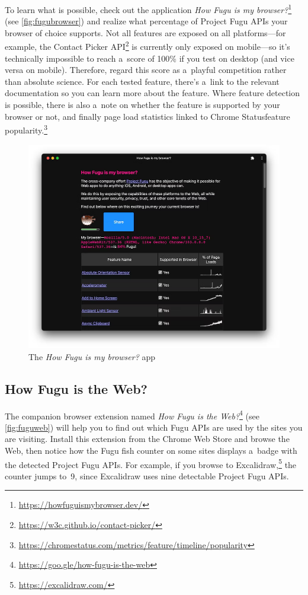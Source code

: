 \documentclass[sigconf]{acmart}
\begin{document}
To learn what is possible, check out the application \textit{How Fugu is my browser?}\footnote{\url{https://howfuguismybrowser.dev/}} (see \autoref{fig:fugubrowser}) and realize what percentage of Project Fugu APIs your browser of choice supports. Not all features are exposed on all platforms—for example, the Contact Picker API\footnote{\url{https://w3c.github.io/contact-picker/}} is currently only exposed on mobile—so it's technically impossible to reach a~score of 100\% if you test on desktop (and vice versa on mobile). Therefore, regard this score as a~playful competition rather than absolute science. For each tested feature, there's a~link to the relevant documentation so you can learn more about the feature. Where feature detection is possible, there is also a~note on whether the feature is supported by your browser or not, and finally page load statistics linked to Chrome Statusfeature popularity.\footnote{\url{https://chromestatus.com/metrics/feature/timeline/popularity}}

\begin{figure}[t]
    \centering
    \includegraphics[width=0.9\columnwidth]{fugubrowser.png}
    \caption{The \textit{How Fugu is my browser?} app}
    \label{fig:fugubrowser}
\end{figure}

\subsection{How Fugu is the Web?}

The companion browser extension named \textit{How Fugu is the Web?}\footnote{\url{https://goo.gle/how-fugu-is-the-web}} (see \autoref{fig:fuguweb}) will help you to find out which Fugu APIs are used by the sites you are visiting. Install this extension from the Chrome Web Store and browse the Web, then notice how the Fugu fish counter on some sites displays a~badge with the detected Project Fugu APIs. For example, if you browse to Excalidraw,\footnote{\url{https://excalidraw.com/}} the counter jumps to~9, since Excalidraw uses nine detectable Project Fugu APIs.
\end{document}
